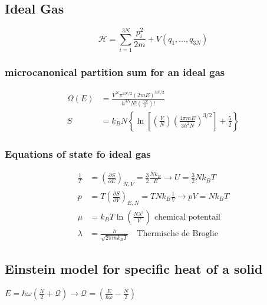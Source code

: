 \subsection*{Ideal Gas}

\begin{equation*}
    \mathcal{H} = \sum_{i=1}^{3N} \frac{p_i^2}{2m} + V(q_1, \dots, q_{3N})
\end{equation*}

\subsubsection*{microcanonical partition sum for an ideal gas}

\begin{equation*}
    \begin{aligned}
        \Omega(E) &= \frac{V^N \pi^{3N/2} (2mE)^{3N/2}}{h^{3N}N!\left( \frac{3N}{2} \right)!} \\
        S &= k_B N \left\lbrace \ln \left[ \left( \frac{V}{N} \right) \left( \frac{4 \pi m E}{3 h^2 N} \right)^{3/2} \right] + \frac{5}{2}\right\rbrace
    \end{aligned}
\end{equation*}


\subsubsection*{Equations of state fo ideal gas}

\begin{equation*}
    \begin{aligned}
        \frac{1}{T} &= \left(\frac{\partial S}{\partial E}\right)_{N,V} = \frac{3}{2} \frac{Nk_B}{E} \rightarrow U = \frac{3}{2} N k_B T \\
        p &= T\left(\frac{\partial S}{\partial V}\right)_{E,N} = TNk_B \frac{1}{V}\rightarrow pV = N k_B T \\
        \mu &= k_B T \ln \left(\frac{N\lambda^3}{V}\right) \text{ chemical potentail} \\
        \lambda &= \frac{h}{\sqrt{2 \pi m k_B T}} \quad \text{Thermische de Broglie}
    \end{aligned}
\end{equation*}

\subsection*{Einstein model for specific heat of a solid}
$E = \hbar \omega \left(\frac{N}{2} + \mathcal{Q}\right) \rightarrow \mathcal{Q} = \left(\frac{E}{\hbar \omega} - \frac{N}{2}\right)$

